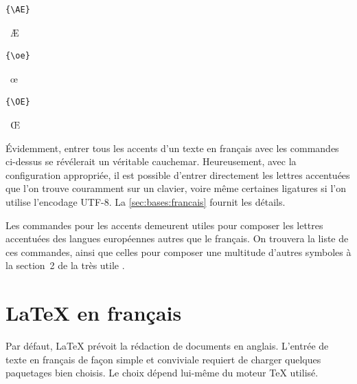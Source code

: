 {\begin{demo}
  \hfill
  \begin{minipage}{0.2\linewidth}
    \begin{texample}
\begin{lstlisting}
{\AE}
\end{lstlisting}
      \producing\ \AE
    \end{texample}
  \end{minipage}
  \hfill
  \begin{minipage}{0.2\linewidth}
    \begin{texample}
\begin{lstlisting}
{\oe}
\end{lstlisting}
      \producing\ \oe
    \end{texample}
  \end{minipage}
  \hfill
  \begin{minipage}{0.2\linewidth}
    \begin{texample}
\begin{lstlisting}
{\OE}
\end{lstlisting}
      \producing\ \OE
    \end{texample}
  \end{minipage}
\end{demo}

Évidemment, entrer tous les accents d'un texte en français avec les
commandes ci-dessus se révélerait un véritable cauchemar.
Heureusement, avec la configuration appropriée, il est possible
d'entrer directement les lettres accentuées que l'on trouve couramment
sur un clavier, voire même certaines ligatures si l'on utilise
l'encodage UTF-8. La \autoref{sec:bases:francais} fournit les détails.

Les commandes pour les accents demeurent utiles pour composer les
lettres accentuées des langues européennes autres que le français. On
trouvera la liste de ces commandes, ainsi que celles pour composer une
multitude d'autres symboles à la section~2 de la très utile %
\citep{comprehensive}.


\section{{\LaTeX} en français}
\label{sec:bases:francais}

Par défaut, LaTeX prévoit la rédaction de documents en anglais.
L'entrée de texte en français de façon simple et conviviale requiert
de charger quelques paquetages bien choisis. Le choix dépend lui-même
du moteur {\TeX} utilisé.

}
